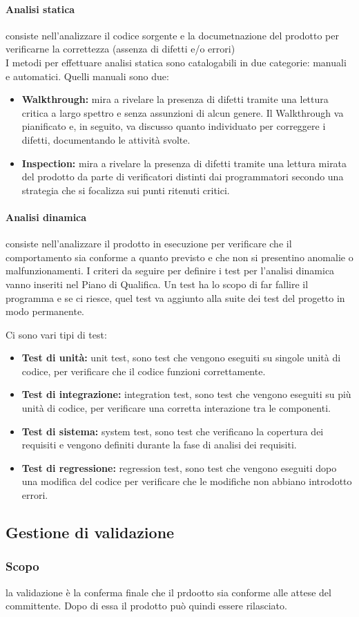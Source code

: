 \paragraph{Analisi statica} consiste nell'analizzare il codice sorgente e la documetnazione del prodotto per verificarne la correttezza (assenza di difetti e/o errori)\\
I metodi per effettuare analisi statica sono catalogabili in due categorie: manuali e automatici.
Quelli manuali sono due:
\begin{itemize}
    \item \textbf{Walkthrough:} mira a rivelare la presenza di difetti tramite una lettura critica a largo spettro e senza assunzioni di alcun genere. Il Walkthrough va pianificato e, in seguito, va discusso quanto individuato per correggere i difetti, documentando le attività svolte.
    \item \textbf{Inspection:} mira a rivelare la presenza di difetti tramite una lettura mirata del prodotto da parte di verificatori distinti dai programmatori secondo una strategia che si focalizza sui punti ritenuti critici. 
\end{itemize}

\paragraph{Analisi dinamica} consiste nell'analizzare il prodotto in esecuzione per verificare che il comportamento sia conforme a quanto previsto e che non si presentino anomalie o malfunzionamenti.
I criteri da seguire per definire i test per l'analisi dinamica vanno inseriti nel Piano di Qualifica. Un test ha lo scopo di far fallire il programma e se ci riesce, quel test va aggiunto alla suite dei test del progetto in modo permanente.

Ci sono vari tipi di test:
\begin{itemize}
    \item \textbf{Test di unità:} unit test, sono test che vengono eseguiti su singole unità di codice, per verificare che il codice funzioni correttamente.
    \item \textbf{Test di integrazione:} integration test, sono test che vengono eseguiti su più unità di codice, per verificare una corretta interazione tra le componenti.
    \item \textbf{Test di sistema:} system test, sono test che verificano la copertura dei requisiti e vengono definiti durante la fase di analisi dei requisiti.
    \item \textbf{Test di regressione:} regression test, sono test che vengono eseguiti dopo una modifica del codice per verificare che le modifiche non abbiano introdotto errori.
\end{itemize}

\subsection{Gestione di validazione}
\subsubsection{Scopo} la validazione è la conferma finale che il prdootto sia conforme alle attese del committente. Dopo di essa il prodotto può quindi essere rilasciato.\\


